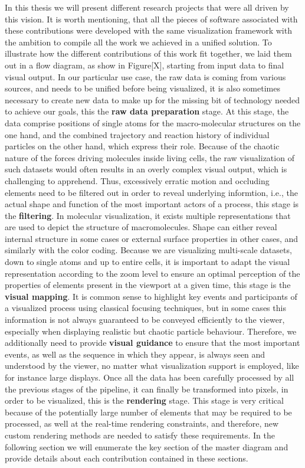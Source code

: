 In this thesis we will present different research projects that were all driven by this vision.
It is worth mentioning, that all the pieces of software associated with these contributions were developed with the same visualization framework with the ambition to compile all the work we achieved in a unified solution.
To illustrate how the different contributions of this work fit together, we laid them out in a flow diagram, as show in Figure[X], starting from input data to final visual output.
In our particular use case, the raw data is coming from various sources, and needs to be unified before being visualized, it is also sometimes necessary to create new data to make up for the missing bit of technology needed to achieve our goals, this the \textbf{raw data preparation} stage. 
At this stage, the data comprise positions of single atoms for the macro-molecular structures on the one hand, and the combined trajectory and reaction history of individual particles on the other hand, which express their role.
Because of the chaotic nature of the forces driving molecules inside living cells, the raw visualization of such datasets would often results in an overly complex visual output, which is challenging to apprehend.
Thus, excessively erratic motion and occluding elements need to be filtered out in order to reveal underlying informtion, i.e., the actual shape and function of the most important actors of a process, this stage is the \textbf{filtering}.
In molecular visualization, it exists multiple representations that are used to depict the structure of macromolecules. 
Shape can either reveal internal structure in some cases or external surface properties in other cases, and similarly with the color coding.
Because we are visualizing multi-scale datasets, down to single atoms and up to entire cells, it is important to adapt the visual representation according to the zoom level to ensure an optimal perception of the properties of elements present in the viewport at a given time, this stage is the \textbf{visual mapping}.
It is common sense to highlight key events and participants of a visualized process using classical focusing techniques, but in some cases this information is not always guaranteed to be conveyed efficiently to the viewer, especially when displaying realistic but chaotic particle behaviour.
Therefore, we additionally need to provide \textbf{visual guidance} to ensure that the most important events, as well as the sequence in which they appear, is always seen and understood by the viewer, no matter what visualization support is employed, like for instance large displays.
Once all the data has been carefully processed by all the previous stages of the pipeline, it can finally be transformed into pixels, in order to be visualized, this is the \textbf{rendering} stage.
This stage is very critical because of the potentially large number of elements that may be required to be processed, as well at the real-time rendering constraints, and therefore, new custom rendering methods are needed to satisfy these requirements.
In the following section we will enumerate the key section of the master diagram and provide details about each contribution contained in these sections.

